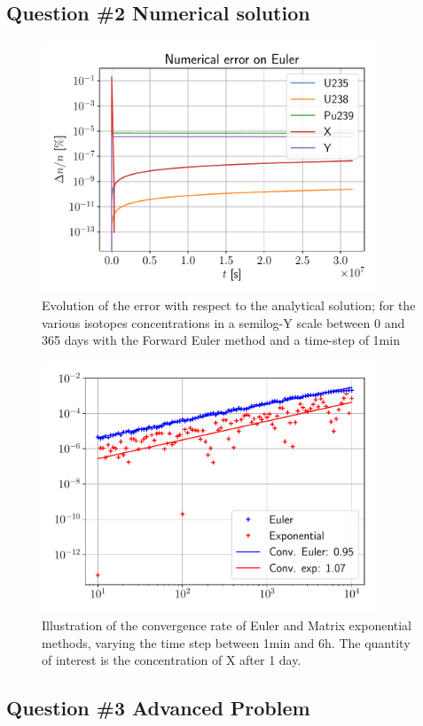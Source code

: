 \documentclass[11pt,a4paper]{article}
\begin{document}
\subsection{Question \#2 Numerical solution}
\begin{figure}[H]
	\includegraphics[width=10cm]{fig/Ex5_euler_error_365_day.pdf}
	\centering
	\caption{Evolution of the error with respect to the analytical solution; for the various isotopes concentrations in a semilog-Y scale  between 0 and 365 days with the Forward Euler method and a time-step of 1min}
\end{figure}

\begin{figure}[H]
	\includegraphics[width=10cm]{fig/Ex5_convergence.pdf}
	\centering
	\caption{Illustration of the convergence rate of Euler and Matrix exponential methods, varying the time step between 1min and 6h. The quantity of interest is the concentration of X after 1 day.}
\end{figure}


\subsection{Question \#3 Advanced Problem}
 
\end{document}
